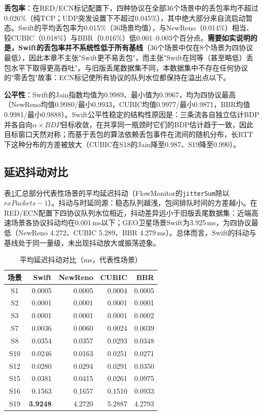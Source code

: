 \textbf{丢包率}：在RED/ECN标记配置下，四种协议在全部36个场景中的丢包率均不超过0.026\%（纯TCP；UDP突发设置下不超过0.045\%），其中绝大部分来自流启动暂态。Swift的平均丢包率为0.015\%（36场景均值），与NewReno（0.014\%）相当、较CUBIC（0.018\%）与BBR（0.016\%）低0.001--0.003个百分点。\textbf{需要如实说明的是，Swift的丢包率并不系统性低于所有基线}（36个场景中仅在8个场景为四协议最低），因此本章不主张"Swift更不易丢包"，而主张"Swift在同等（甚至略低）丢包水平下取得更高吞吐"。与旧版丢尾数据集不同，本数据集中不存在任何协议的"零丢包"故事：ECN标记使所有协议的队列水位都保持在溢出点以下。

\textbf{公平性}：Swift的Jain指数均值为0.9989、最小值为0.9967，均为四协议最高（NewReno均值0.9980/最小0.9933，CUBIC均值0.9977/最小0.9871，BBR均值0.9981/最小0.9888）。Swift公平性稳定的结构性原因是：三条流各自独立估计BDP并各自向$\alpha \times BDP$目标收敛，在共享同一瓶颈时它们的BDP估计趋于一致，因此目标窗口天然对称；而基于丢包的算法依赖丢包事件在流间的随机分布，长RTT下这种分布的方差被放大（CUBIC在S18的Jain降至0.987、S19降至0.990）。

\subsection{延迟抖动对比}

表\ref{tab:jitter_summary}汇总部分代表性场景的平均延迟抖动（FlowMonitor的\texttt{jitterSum}除以$rxPackets-1$）。抖动与时延同源：稳态队列越浅，包间排队时间的方差越小。在RED/ECN配置下四协议队列水位相近，抖动差异远小于旧版丢尾数据集：近端高速场景各协议抖动均在0.001\,ms以下；GEO卫星场景Swift为3.925\,ms，为四协议最低（NewReno 4.272、CUBIC 5.289、BBR 4.279\,ms）。总体而言，Swift的抖动与基线处于同一量级，未出现抖动放大或振荡迹象。

\begin{table}[htbp]
\centering
\caption{平均延迟抖动对比（ms，代表性场景）}
\label{tab:jitter_summary}
\small
\begin{tabular}{|c|r|r|r|r|}
\hline
\textbf{场景} & \textbf{Swift} & \textbf{NewReno} & \textbf{CUBIC} & \textbf{BBR} \\
\hline
S1 & 0.0005 & 0.0005 & 0.0004 & 0.0005 \\
S2 & 0.0001 & 0.0001 & 0.0001 & 0.0001 \\
S3 & 0.0001 & 0.0001 & 0.0001 & 0.0002 \\
S7 & 0.0036 & 0.0060 & 0.0024 & 0.0039 \\
S8 & 0.0354 & 0.0357 & 0.0293 & 0.0348 \\
S10 & 0.0246 & 0.0163 & 0.0251 & 0.0271 \\
S12 & 0.0280 & 0.0294 & 0.0291 & 0.0350 \\
S15 & 0.0381 & 0.0415 & 0.0261 & 0.0975 \\
S16 & 0.1563 & 0.1657 & 0.1510 & 0.0933 \\
S19 & \textbf{3.9248} & 4.2720 & 5.2887 & 4.2793 \\
\hline
\end{tabular}
\end{table}

